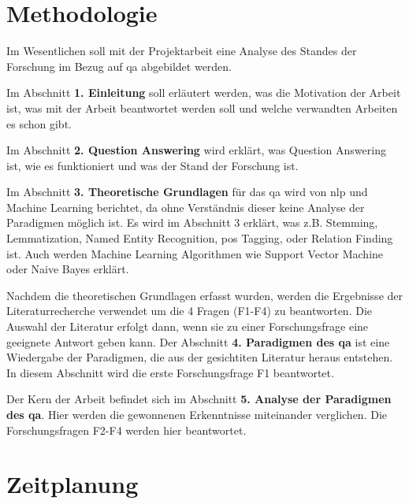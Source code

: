 \documentclass[
        ngerman,
        paper=a4,
        numbers=noendperiod,
]{scrreprt}
\begin{document}
\chapter{Methodologie}


Im Wesentlichen soll mit der Projektarbeit eine Analyse des Standes der Forschung im Bezug auf \ac{qa} abgebildet werden.

Im Abschnitt \textbf{1. Einleitung} soll erläutert werden, was die Motivation der Arbeit ist, was mit der Arbeit beantwortet werden soll und welche verwandten Arbeiten es schon gibt.

Im Abschnitt \textbf{2. Question Answering} wird erklärt, was Question Answering ist, wie es funktioniert und was der Stand der Forschung ist.

Im Abschnitt \textbf{3. Theoretische Grundlagen} für das \ac{qa} wird von \ac{nlp} und Machine Learning berichtet, da ohne Verständnis dieser keine Analyse der Paradigmen möglich ist. Es wird im Abschnitt 3 erklärt, was z.B. Stemming, Lemmatization, Named Entity Recognition, \ac{pos} Tagging, oder Relation Finding ist. Auch werden Machine Learning Algorithmen wie Support Vector Machine oder Naive Bayes erklärt. 

Nachdem die theoretischen Grundlagen erfasst wurden, werden die Ergebnisse der Literaturrecherche verwendet um die 4 Fragen (F1-F4) zu beantworten. Die Auswahl der Literatur erfolgt dann, wenn sie zu einer Forschungsfrage eine geeignete Antwort geben kann. Der Abschnitt \textbf{4. Paradigmen des \ac{qa}} ist eine Wiedergabe der Paradigmen, die aus der gesichtiten Literatur heraus entstehen. In diesem Abschnitt wird die erste Forschungsfrage F1 beantwortet.

Der Kern der Arbeit befindet sich im Abschnitt \textbf{5. Analyse der Paradigmen des \ac{qa}}. Hier werden die gewonnenen Erkenntnisse miteinander verglichen. Die Forschungsfragen F2-F4 werden hier beantwortet.



\chapter{Zeitplanung}
\end{document}
